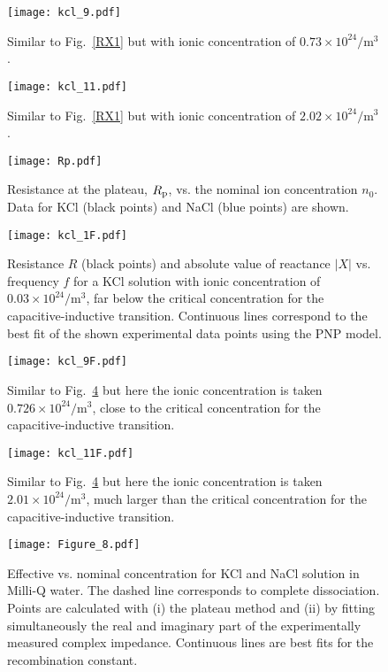 \documentclass[preprint,aps,pre]{revtex4}
\begin{document}
\begin{figure}[htb]
	\texttt{[image: kcl\_9.pdf]}
	\caption{Similar to Fig.~\ref{RX1} but with ionic concentration of $0.73\times 10^{24}/\mathrm{m^3}$. }
	\label{RX9}
\end{figure}

\begin{figure}[htb]
	\texttt{[image: kcl\_11.pdf]}
	\caption{Similar to Fig.~\ref{RX1} but with ionic concentration of  $2.02\times 10^{24}/\mathrm{m^3}$.}
	\label{RX11}
\end{figure}

\begin{figure}[htb]
	\texttt{[image: Rp.pdf]}
	\caption{Resistance at the plateau, $R_{\rm p}$, vs. the nominal ion concentration $n_0$. Data for KCl (black points) and NaCl (blue points) are shown. }
	\label{Rp}
\end{figure}

\begin{figure}[htb]
	\texttt{[image: kcl\_1F.pdf]}
	\caption{Resistance $R$ (black points) and absolute value of reactance $\left | X \right|$ vs. frequency $f$ for a KCl solution with ionic concentration of $0.03\times 10^{24}/\mathrm{m^3}$, far below the critical concentration for the capacitive-inductive transition. Continuous lines correspond to the best fit of the shown experimental data points using the PNP model.}
	\label{F1}
\end{figure}

\begin{figure}[htb]
	\texttt{[image: kcl\_9F.pdf]}
	\caption{Similar to Fig.~\ref{F1} but here the ionic concentration is taken $0.726\times 10^{24}/\mathrm{m^3}$, close to the critical concentration for the capacitive-inductive transition.}
	\label{F9}
\end{figure}

\begin{figure}[htb]
	\texttt{[image: kcl\_11F.pdf]}
	\caption{Similar to Fig.~\ref{F1} but here the ionic concentration is taken $2.01\times 10^{24}/\mathrm{m^3}$, much larger than the critical concentration for the capacitive-inductive transition.}
	\label{F11}
\end{figure}

\begin{figure}[htb]
	\texttt{[image: Figure\_8.pdf]}
	\caption{Effective vs. nominal concentration for KCl and NaCl solution in Milli-Q water. The dashed line corresponds to complete dissociation. Points are calculated with (i) the plateau method and (ii) by fitting simultaneously the real and imaginary part of the experimentally measured complex impedance. Continuous lines are best fits for the recombination constant.}
	\label{recomb}
\end{figure}
\end{document}
